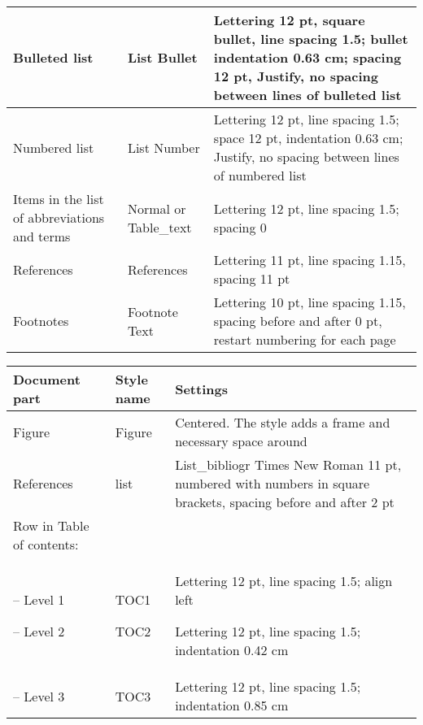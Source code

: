 \begin{table}[!ht]
\begin{tabular}{|L{3.7cm}|L{3.0cm}|L{7.2cm}|}
    Bulleted list & List Bullet & Lettering 12 pt, square bullet, line spacing 1.5;
                                  bullet indentation 0.63 cm; spacing 12 pt,
                                  Justify, no spacing between lines of bulleted
                                  list \\ \hline

    Numbered list & List Number & Lettering 12 pt, line spacing 1.5; space 12 pt,
                                  indentation 0.63 cm; Justify, no spacing
                                  between lines of numbered list \\ \hline

    Items in the list of
    abbreviations and terms & Normal or
                              Table\_text & Lettering 12 pt, line spacing 1.5; spacing 0 \\ \hline

    References & References & Lettering 11 pt, line spacing 1.15, spacing
                              11 pt \\ \hline

    Footnotes& Footnote Text &
                               Lettering 10 pt, line spacing 1.15, spacing
                               before and after 0 pt, restart numbering for
                               each page \\ \hline

  \end{tabular}
\end{table}


\begin{table}[!ht]
  \centering
  \begin{tabular}{|L{3.7cm}|L{3.0cm}|L{7.2cm}|}
    \hline
    \textbf{Document part} & \textbf{Style name} & \textbf{Settings}\\  \hline
    Figure &  Figure & Centered. The style adds a frame and necessary space around \\ \hline

    References &list & List\_bibliogr Times New Roman 11 pt, numbered with
                       numbers in square brackets, spacing before and
                       after 2 pt \\ \hline

    Row in Table of
    contents: & & \\

    -- Level 1

    -- Level 2 & TOC1

                 TOC2  &  Lettering 12 pt, line spacing 1.5; align left

                         Lettering 12 pt, line spacing 1.5;
                         indentation 0.42 cm \\

    -- Level 3 &  TOC3 &  Lettering 12 pt, line spacing 1.5;
                         indentation 0.85 cm \\ \hline
  \end{tabular}
\end{table}
